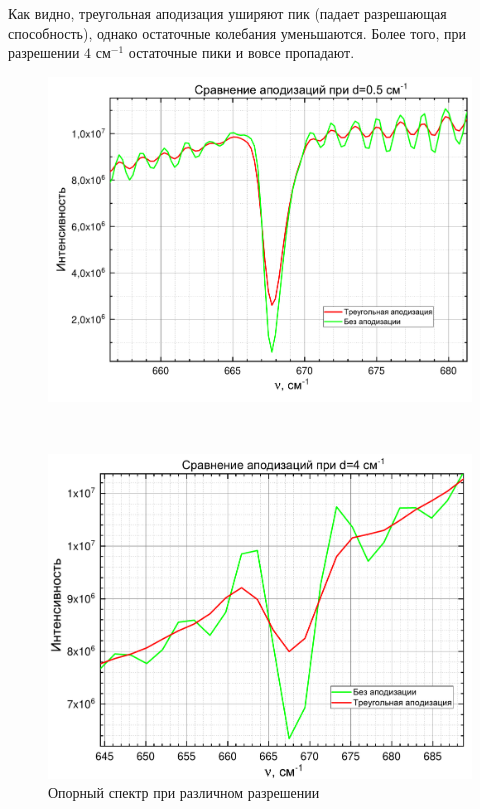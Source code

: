 Как видно, треугольная аподизация уширяют пик (падает разрешающая способность), однако остаточные колебания уменьшаются. Более того, при разрешении $4 \text{ см}^{-1}$ остаточные пики и вовсе пропадают.

\begin{figure}[H]
	\centering
	\begin{minipage}[h!]{0.9\linewidth}
		\centering
		\includegraphics[width=1\linewidth]{data/apodiz_comparation_0_5}
	\end{minipage}\\
	\begin{minipage}[h!]{0.9\linewidth}
		\centering
		\includegraphics[width=1\linewidth]{data/apodiz_comparation_4}
	\end{minipage}
	\caption{Опорный спектр при различном разрешении}
	\label{apotis}
\end{figure}

